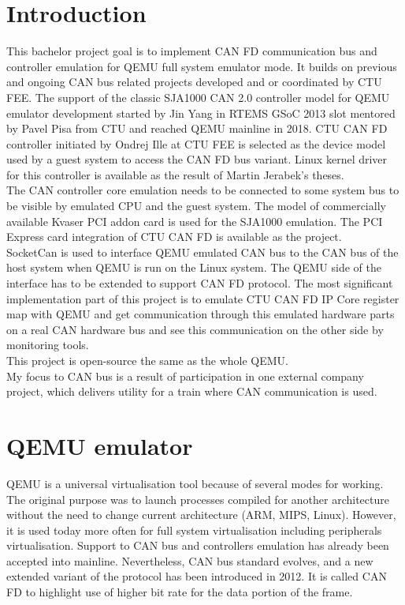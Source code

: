 \documentclass{ctuthesis}
\begin{document}
\maketitle
\chapter{Introduction}
 This bachelor project goal is to implement CAN FD communication bus and controller emulation for QEMU full system emulator mode. It builds on previous and ongoing CAN bus related projects developed and or coordinated by CTU FEE. The support of the classic SJA1000 CAN 2.0 controller model for QEMU emulator development started by Jin Yang in RTEMS GSoC 2013 slot mentored by Pavel Pisa from CTU and reached QEMU mainline in 2018. \cite{qemu-mainline} CTU CAN FD controller \cite{ctu-canfd-core} initiated by Ondrej Ille at CTU FEE is selected as the device model used by a guest system to access the CAN FD bus variant. Linux kernel driver for this controller is available as the result of Martin Jerabek's theses. \cite{ctu-canfd} \\
 The CAN controller core emulation needs to be connected to some system bus to be visible by emulated CPU and the guest system. The model of commercially available Kvaser PCI addon card is used for the SJA1000 emulation. The PCI Express card integration of CTU CAN FD is available as the project. \cite{ctu-project} \\
 SocketCan is used to interface QEMU emulated CAN bus to the CAN bus of the host system when QEMU is run on the Linux system. The QEMU side of the interface has to be extended to support CAN FD protocol.
 The most significant implementation part of this project is to emulate CTU CAN FD IP Core register map \cite{progdum} with QEMU and get communication through this emulated hardware parts on a real CAN hardware bus and see this communication on the other side by monitoring tools. \\
 This project is open-source the same as the whole QEMU. \\
 My focus to CAN bus is a result of participation in one external company
 project, which delivers utility for a train where CAN communication is used.


\chapter{QEMU emulator}
 QEMU is a universal virtualisation tool because of several modes for working. The original purpose was to launch processes compiled for another architecture without the need to change current architecture (ARM, MIPS, Linux). However, it is used today more often for full system virtualisation including peripherals virtualisation. Support to CAN bus and controllers emulation has already been accepted into mainline. Nevertheless, CAN bus standard evolves, and a new extended variant of the protocol has been introduced in 2012. It is called CAN FD to highlight use of higher bit rate for the data portion of the frame.
\end{document}
